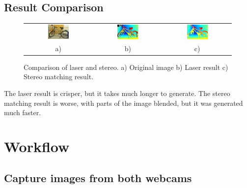 \documentclass[11pt,fleqn]{article}
\begin{document}
\subsection{Result Comparison}
\begin{figure}[!ht]
\label{fig:result1}
\centering
\setlength{}
\begin{tabular}{ccc}
\includegraphics[width=0.33\textwidth]{images/_im0-600.jpg} &
\includegraphics[width=0.33\textwidth]{images/disp0GT-600.jpg} &
\includegraphics[width=0.33\textwidth]{images/_disp-600.jpg} \\[2pt]
a) & b) & c) \\
\end{tabular}
\caption{Comparison of laser and stereo. a) Original image b) Laser result c) Stereo matching result.}
\end{figure}

The laser result is crisper, but it takes much longer to generate. The stereo matching result is worse, with parts of the image blended, but it was generated much faster. 


\section{Workflow}

\subsection{Capture images from both webcams}  
\end{document}
